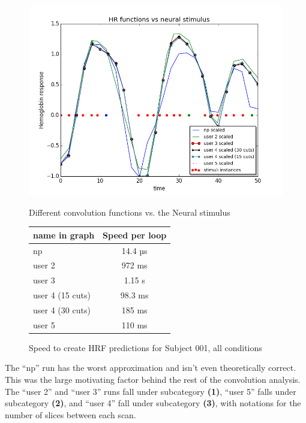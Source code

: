 \begin{figure}[ht]
\centering
	\begin{minipage}[b]{0.45\linewidth}
		\centering
		\includegraphics[width=.8\linewidth]{images/convolution_vs_neural_stimulus}  
		\caption{\scriptsize{Different convolution functions vs. the Neural stimulus}}
		\label{fig:convolution}

	\end{minipage}
\quad
	\begin{minipage}[b]{0.45\linewidth}
		\centering
		\begin{tabular}{|l | c|}
		\hline
		name in graph & Speed per loop \\
		\hline
		np    			 & 14.4 µs \\
		user 2     		 & 972 ms  \\
		user 3     		 & 1.15 s  \\
		user 4 (15 cuts) & 98.3 ms \\
		user 4 (30 cuts) & 185 ms  \\
		user 5     	 	 & 110 ms  \\
		\hline
		\end{tabular}
		\vspace{5mm}
		\caption{\scriptsize{Speed to create HRF predictions for Subject 001, 
		all conditions}}
		\label{table:convolution}
	\end{minipage}
\end{figure}

The ``np'' run has the worst approximation and isn't even theoretically 
correct. This was the large motivating factor behind the rest of the
convolution analysis. 
The ``user 2'' and ``user 3'' runs fall under subcategory \textbf{(1)}, 
``user 5'' falls under subcategory \textbf{(2)}, and ``user 4'' fall under 
subcategory \textbf{(3)}, with notations for the number of slices between each 
scan.

